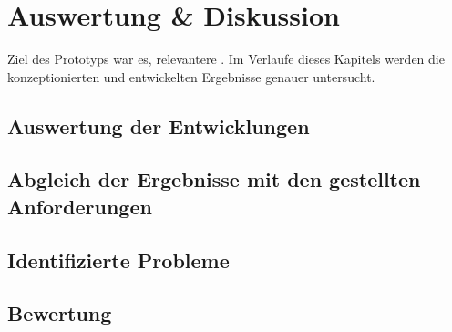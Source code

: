 \chapter{Auswertung \& Diskussion}
\label{ch:evaluation}
Ziel des Prototyps war es, relevantere . Im Verlaufe dieses Kapitels werden die konzeptionierten und entwickelten Ergebnisse genauer untersucht.

\section{Auswertung der Entwicklungen}
\label{sec:evaluation}

\section{Abgleich der Ergebnisse mit den gestellten Anforderungen}
\label{sec:reviewRequirements}

\section{Identifizierte Probleme}
\label{sec:problems}

\section{Bewertung}
\label{sec:assessment}
